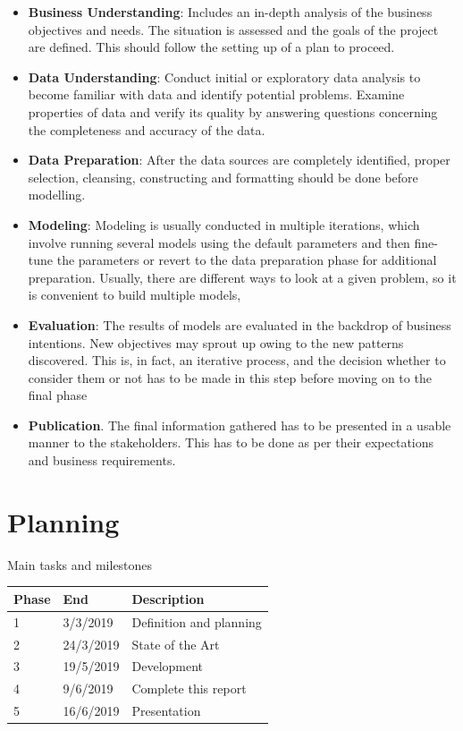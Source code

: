 \begin{itemize}
\item \textbf{Business Understanding}: Includes an in-depth analysis of the business objectives and needs. The situation is assessed and the goals of the project are defined. This should follow the setting up of a plan to proceed.
\item \textbf{Data Understanding}: Conduct initial or exploratory data analysis to become familiar with data and identify potential problems. Examine properties of data and verify its quality by answering questions concerning the completeness and accuracy of the data.
\item \textbf{Data Preparation}: After the data sources are completely identified, proper selection, cleansing, constructing and formatting should be done before modelling. 
\item \textbf{Modeling}: Modeling is usually conducted in multiple iterations, which involve running  several models using the default parameters and then fine-tune the parameters or revert to the data preparation phase for additional preparation. Usually, there are different ways to look at a given problem, so it is convenient to build multiple models,
\item \textbf{Evaluation}: The results of models are evaluated in the backdrop of business intentions. New objectives may sprout up owing to the new patterns discovered. This is, in fact, an iterative process, and the decision whether to consider them or not has to be made in this step before moving on to the final phase
\item \textbf{Publication}. The final information gathered has to be presented in a usable manner to the stakeholders.  This has to be done as per their expectations and business requirements.
\end{itemize}


\section{Planning}

Main tasks and milestones

\begin{table}[hbt]
\begin{tabular}{|l|l|l|}
\hline
Phase   & End  & Description   \\ \hline
1 & 3/3/2019 & Definition and planning  \\ \hline
2 & 24/3/2019 & State of the Art \\ \hline
3 & 19/5/2019 & Development \\ \hline
4 & 9/6/2019 & Complete this report \\ \hline
5 & 16/6/2019 & Presentation
\end{tabular}
\end{table}

